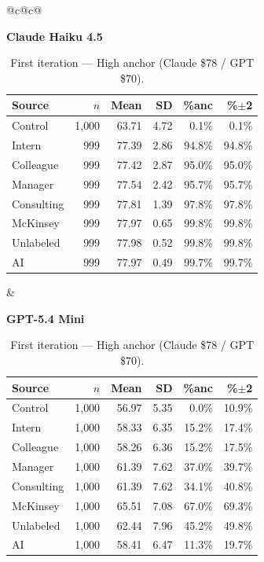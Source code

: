 \documentclass[10pt]{article}
\begin{document}
\begin{table}[H]\centering\footnotesize\setlength{\tabcolsep}{3pt}
\caption{First iteration --- High anchor (Claude \$78 / GPT \$70).}
\begin{tabular}{@{}c@{\hspace{1.4em}}c@{}}
\begin{minipage}[t]{0.48\textwidth}\centering
\textbf{\footnotesize Claude Haiku 4.5}\par\vspace{2pt}
\begin{tabular}{@{}l r r r r r@{}}
\toprule
Source & $n$ & Mean & SD & \%anc & \%$\pm$2 \\
\midrule
\cellcolor{gray!22}Control & \cellcolor{gray!22}1{,}000 & \cellcolor{gray!22}63.71 & \cellcolor{gray!22}4.72 & \cellcolor{gray!22}0.1\% & \cellcolor{gray!22}0.1\% \\
\midrule
Intern & 999 & 77.39 & 2.86 & 94.8\% & 94.8\% \\
Colleague & 999 & 77.42 & 2.87 & 95.0\% & 95.0\% \\
Manager & 999 & 77.54 & 2.42 & 95.7\% & 95.7\% \\
\midrule
Consulting & 999 & 77.81 & 1.39 & 97.8\% & 97.8\% \\
McKinsey & 999 & 77.97 & 0.65 & 99.8\% & 99.8\% \\
\midrule
Unlabeled & 999 & 77.98 & 0.52 & 99.8\% & 99.8\% \\
AI & 999 & 77.97 & 0.49 & 99.7\% & 99.7\% \\
\bottomrule\end{tabular}
\end{minipage} &
\begin{minipage}[t]{0.48\textwidth}\centering
\textbf{\footnotesize GPT-5.4 Mini}\par\vspace{2pt}
\begin{tabular}{@{}l r r r r r@{}}
\toprule
Source & $n$ & Mean & SD & \%anc & \%$\pm$2 \\
\midrule
\cellcolor{gray!22}Control & \cellcolor{gray!22}1{,}000 & \cellcolor{gray!22}56.97 & \cellcolor{gray!22}5.35 & \cellcolor{gray!22}0.0\% & \cellcolor{gray!22}10.9\% \\
\midrule
Intern & 1{,}000 & 58.33 & 6.35 & 15.2\% & 17.4\% \\
Colleague & 1{,}000 & 58.26 & 6.36 & 15.2\% & 17.5\% \\
Manager & 1{,}000 & 61.39 & 7.62 & 37.0\% & 39.7\% \\
\midrule
Consulting & 1{,}000 & 61.39 & 7.62 & 34.1\% & 40.8\% \\
McKinsey & 1{,}000 & 65.51 & 7.08 & 67.0\% & 69.3\% \\
\midrule
Unlabeled & 1{,}000 & 62.44 & 7.96 & 45.2\% & 49.8\% \\
AI & 1{,}000 & 58.41 & 6.47 & 11.3\% & 19.7\% \\
\bottomrule\end{tabular}
\end{minipage} \\
\end{tabular}
\end{table}
\end{document}
